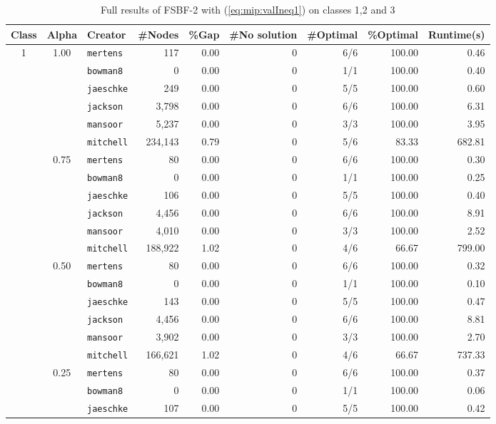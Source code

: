 \begin{table}[tpb]
	\tiny
	\caption{Full results of FSBF-2 with (\ref{eq:mip:valIneq1}) on classes 1,2 and 3}
	\centering
	\vspace{2mm}
	\begin{tabular}{cclrrrrrr}
		\toprule
		Class & Alpha & Creator & \#Nodes & \%Gap & \#No solution & \#Optimal & \%Optimal & Runtime(s) \\\midrule\midrule
		1 & 1.00 & {\tt mertens}	& 117 & 0.00 & 0 & 6/6 & 100.00 & 0.46 \\
		&		& {\tt bowman8}	& 0 & 0.00 & 0 & 1/1 & 100.00 & 0.40 \\
		&		& {\tt jaeschke}	& 249 & 0.00 & 0 & 5/5 & 100.00 & 0.60 \\
		&		& {\tt jackson}	& 3,798 & 0.00 & 0 & 6/6 & 100.00 & 6.31 \\
		&		& {\tt mansoor}	& 5,237 & 0.00 & 0 & 3/3 & 100.00 & 3.95 \\
		&		& {\tt mitchell}	& 234,143 & 0.79 & 0 & 5/6 & 83.33 & 682.81 \\
		& 0.75	& {\tt mertens}	& 80 & 0.00 & 0 & 6/6 & 100.00 & 0.30 \\
		&		& {\tt bowman8}	& 0 & 0.00 & 0 & 1/1 & 100.00 & 0.25 \\
		&		& {\tt jaeschke}	& 106 & 0.00 & 0 & 5/5 & 100.00 & 0.40 \\
		&		& {\tt jackson}	& 4,456 & 0.00 & 0 & 6/6 & 100.00 & 8.91 \\
		&		& {\tt mansoor}	& 4,010 & 0.00 & 0 & 3/3 & 100.00 & 2.52 \\
		&		& {\tt mitchell}	& 188,922 & 1.02 & 0 & 4/6 & 66.67 & 799.00 \\
		& 0.50	& {\tt mertens}	& 80 & 0.00 & 0 & 6/6 & 100.00 & 0.32 \\
		&		& {\tt bowman8}	& 0 & 0.00 & 0 & 1/1 & 100.00 & 0.10 \\
		&		& {\tt jaeschke}	& 143 & 0.00 & 0 & 5/5 & 100.00 & 0.47 \\
		&		& {\tt jackson}	& 4,456 & 0.00 & 0 & 6/6 & 100.00 & 8.81 \\
		&		& {\tt mansoor}	& 3,902 & 0.00 & 0 & 3/3 & 100.00 & 2.70 \\
		&		& {\tt mitchell}	& 166,621 & 1.02 & 0 & 4/6 & 66.67 & 737.33 \\
		& 0.25	& {\tt mertens}	& 80 & 0.00 & 0 & 6/6 & 100.00 & 0.37 \\
		&		& {\tt bowman8}	& 0 & 0.00 & 0 & 1/1 & 100.00 & 0.06 \\
		&		& {\tt jaeschke}	& 107 & 0.00 & 0 & 5/5 & 100.00 & 0.42 \\

\end{tabular}
\end{table}
